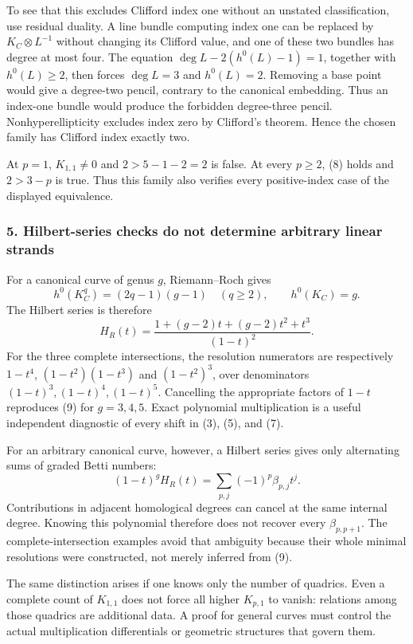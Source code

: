\documentclass[11pt]{article}
\begin{document}
To see that this excludes Clifford index one without an unstated classification, use residual duality. A line bundle computing index one can be replaced by $K_C\otimes L^{-1}$ without changing its Clifford value, and one of these two bundles has degree at most four. The equation
$\deg L-2(h^0(L)-1)=1$, together with $h^0(L)\ge2$, then forces $\deg L=3$ and $h^0(L)=2$. Removing a base point would give a degree-two pencil, contrary to the canonical embedding. Thus an index-one bundle would produce the forbidden degree-three pencil. Nonhyperellipticity excludes index zero by Clifford's theorem. Hence the chosen family has Clifford index exactly two.

At $p=1$, $K_{1,1}\ne0$ and $2>5-1-2=2$ is false. At every $p\ge2$, (8) holds and $2>3-p$ is true. Thus this family also verifies every positive-index case of the displayed equivalence.

\subsubsection{5. Hilbert-series checks do not determine arbitrary linear strands}
For a canonical curve of genus $g$, Riemann--Roch gives
\[
 h^0(K_C^q)=(2q-1)(g-1)\quad(q\ge2),\qquad
 h^0(K_C)=g.
\]
The Hilbert series is therefore
\[
 H_R(t)=\frac{1+(g-2)t+(g-2)t^2+t^3}{(1-t)^2}.         \tag{9}
\]
For the three complete intersections, the resolution numerators are respectively
$1-t^4$, $(1-t^2)(1-t^3)$ and $(1-t^2)^3$, over denominators $(1-t)^3,(1-t)^4,(1-t)^5$. Cancelling the appropriate factors of $1-t$ reproduces (9) for $g=3,4,5$. Exact polynomial multiplication is a useful independent diagnostic of every shift in (3), (5), and (7).

For an arbitrary canonical curve, however, a Hilbert series gives only alternating sums of graded Betti numbers:
\[
 (1-t)^gH_R(t)=\sum_{p,j}(-1)^p\beta_{p,j}t^j.
\]
Contributions in adjacent homological degrees can cancel at the same internal degree. Knowing this polynomial therefore does not recover every $\beta_{p,p+1}$. The complete-intersection examples avoid that ambiguity because their whole minimal resolutions were constructed, not merely inferred from (9).

The same distinction arises if one knows only the number of quadrics. Even a complete count of $K_{1,1}$ does not force all higher $K_{p,1}$ to vanish: relations among those quadrics are additional data. A proof for general curves must control the actual multiplication differentials or geometric structures that govern them.
\end{document}
